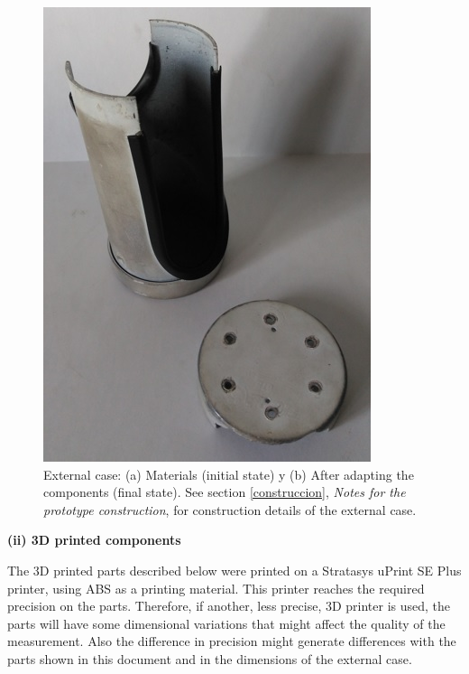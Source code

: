 \documentclass[12pt,letterpaper]{article}
\numberwithin{figure}{section}
\numberwithin{equation}{section}
\numberwithin{table}{section}
\begin{document}
\begin{figure}[H]
\begin{minipage}{.45\textwidth}
     \includegraphics[width=\linewidth]{Figuras/figure_24_b.jpg}
     \end{minipage}
        
     \caption{External case: (a) Materials (initial state) y (b) After adapting the components (final state). See section \ref{construccion}, \textit{Notes for the prototype construction}, for construction details of the external case.}
     \label{fig:24}
 \end{figure}


 \begin{flushleft}
 \textbf{(ii) 3D printed components} 
 \end{flushleft}

The 3D printed parts described below were printed on a Stratasys uPrint SE Plus printer, using ABS as a printing material. This printer reaches the required precision on the parts. Therefore, if another, less precise, 3D printer is used, the parts will have some dimensional variations that might affect the quality of the measurement. Also the difference in precision might generate differences with the parts shown in this document and in the dimensions of the external case.
\end{document}

